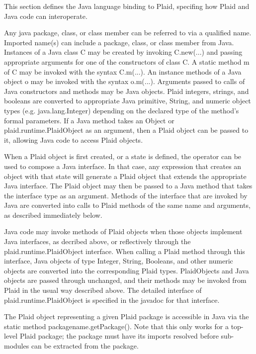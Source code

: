 This section defines the Java language binding to Plaid, specifing
how Plaid and Java code can interoperate.


  Any java package, class, or
class member can be referred to via a qualified name.  Imported
name(s) can include a package, class, or class member from Java.
Instances of a Java class C may be created by invoking C.new(...)  and
passing appropriate arguments for one of the constructors of class C.
A static method m of C may be invoked with the syntax C.m(...).  An
instance methods of a Java object o may be invoked with the syntax
o.m(...).  Arguments passed to calls of Java constructors and methods
may be Java objects.  Plaid integers, strings, and booleans are
converted to appropriate Java primitive, String, and numeric object
types (e.g. java.lang.Integer) depending on the declared type of the
method's formal parameters.  If a Java method takes an Object or
plaid.runtime.PlaidObject as an argument, then a Plaid object can be
passed to it, allowing Java code to access Plaid objects.

  When a Plaid object is first
created, or a state is defined, the  operator can be used
to compose a Java interface.  In that case, any 
expression that creates an object with that state will generate a
Plaid object that extends the appropriate Java interface.  The Plaid
object may then be passed to a Java method that takes the interface
type as an argument.  Methods of the interface that are invoked by
Java are converted into calls to Plaid methods of the same name and
arguments, as described immediately below.

  Java code may invoke methods of
Plaid objects when those objects implement Java interfaces, as
decribed above, or reflectively through the plaid.runtime.PlaidObject
interface.  When calling a Plaid method through this interface, Java
objects of type Integer, String, Booleans, and other numeric objects
are converted into the corresponding Plaid types.  PlaidObjects and
Java objects are passed through unchanged, and their methods may be
invoked from Plaid in the usual way described above.  The detailed
interface of plaid.runtime.PlaidObject is specified in the javadoc
for that interface.

The Plaid object representing a given Plaid package is accessible in
Java via the static method packagename.getPackage().  Note that this
only works for a top-level Plaid package; the package must have its
imports resolved before sub-modules can be extracted from the package.

